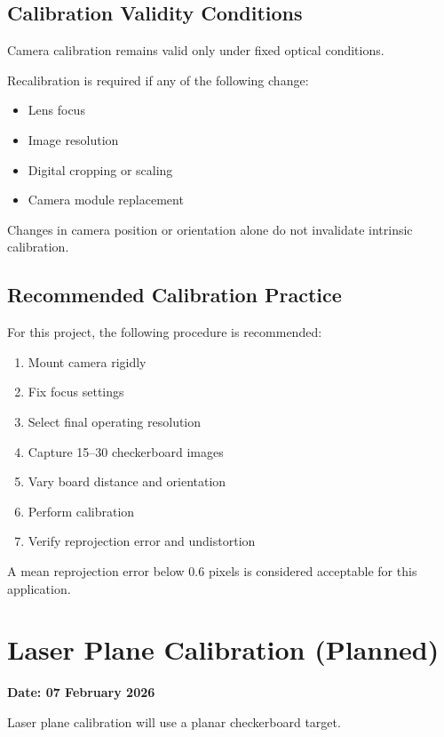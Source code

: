 \documentclass[11pt,a4paper]{article}
\begin{document}
\subsection{Calibration Validity Conditions}

Camera calibration remains valid only under fixed optical conditions.

Recalibration is required if any of the following change:

\begin{itemize}
  \item Lens focus
  \item Image resolution
  \item Digital cropping or scaling
  \item Camera module replacement
\end{itemize}

Changes in camera position or orientation alone do not invalidate intrinsic calibration.

\subsection{Recommended Calibration Practice}

For this project, the following procedure is recommended:

\begin{enumerate}
  \item Mount camera rigidly
  \item Fix focus settings
  \item Select final operating resolution
  \item Capture 15--30 checkerboard images
  \item Vary board distance and orientation
  \item Perform calibration
  \item Verify reprojection error and undistortion
\end{enumerate}

A mean reprojection error below 0.6 pixels is considered acceptable for this application.


\section{Laser Plane Calibration (Planned)}

\textbf{Date: 07 February 2026}

Laser plane calibration will use a planar checkerboard target.
\end{document}
